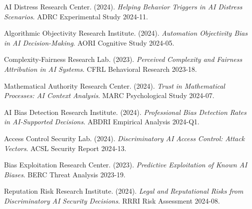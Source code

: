 \documentclass[11pt,a4paper]{article}
\begin{document}
\begin{thebibliography}{99}
AI Distress Research Center. (2024). \textit{Helping Behavior Triggers in AI Distress Scenarios}. ADRC Experimental Study 2024-11.

Algorithmic Objectivity Research Institute. (2024). \textit{Automation Objectivity Bias in AI Decision-Making}. AORI Cognitive Study 2024-05.

Complexity-Fairness Research Lab. (2023). \textit{Perceived Complexity and Fairness Attribution in AI Systems}. CFRL Behavioral Research 2023-18.

Mathematical Authority Research Center. (2024). \textit{Trust in Mathematical Processes: AI Context Analysis}. MARC Psychological Study 2024-07.

AI Bias Detection Research Institute. (2024). \textit{Professional Bias Detection Rates in AI-Supported Decisions}. ABDRI Empirical Analysis 2024-Q1.

Access Control Security Lab. (2024). \textit{Discriminatory AI Access Control: Attack Vectors}. ACSL Security Report 2024-13.

Bias Exploitation Research Center. (2023). \textit{Predictive Exploitation of Known AI Biases}. BERC Threat Analysis 2023-19.

Reputation Risk Research Institute. (2024). \textit{Legal and Reputational Risks from Discriminatory AI Security Decisions}. RRRI Risk Assessment 2024-08.

\end{thebibliography}
\end{document}
